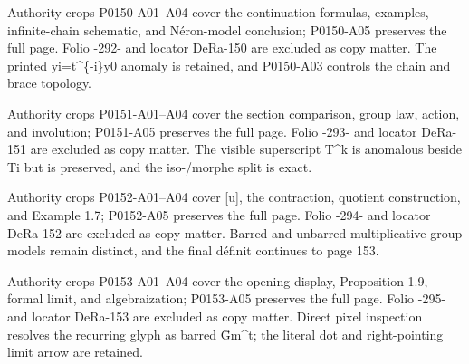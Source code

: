 \documentclass[11pt,a4paper]{article}
\begin{document}
\par\medskip
\hypertarget{D018-P0150}{}
\par\smallskip
Authority crops P0150-A01--A04 cover the continuation formulas, examples, infinite-chain schematic, and Néron-model conclusion; P0150-A05 preserves the full page. Folio -292- and locator DeRa-150 are excluded as copy matter. The printed y\textunderscore{}i=t\textasciicircum{}\{-i\}y\textunderscore{}0 anomaly is retained, and P0150-A03 controls the chain and brace topology.


\par\medskip
\hypertarget{D018-P0151}{}
\par\smallskip
Authority crops P0151-A01--A04 cover the section comparison, group law, action, and involution; P0151-A05 preserves the full page. Folio -293- and locator DeRa-151 are excluded as copy matter. The visible superscript T\textasciicircum{}k is anomalous beside T\textunderscore{}i but is preserved, and the iso-/morphe split is exact.


\par\medskip
\hypertarget{D018-P0152}{}
\par\smallskip
Authority crops P0152-A01--A04 cover [u], the contraction, quotient construction, and Example 1.7; P0152-A05 preserves the full page. Folio -294- and locator DeRa-152 are excluded as copy matter. Barred and unbarred multiplicative-group models remain distinct, and the final définit continues to page 153.


\par\medskip
\hypertarget{D018-P0153}{}
\par\smallskip
Authority crops P0153-A01--A04 cover the opening display, Proposition 1.9, formal limit, and algebraization; P0153-A05 preserves the full page. Folio -295- and locator DeRa-153 are excluded as copy matter. Direct pixel inspection resolves the recurring glyph as barred Ḡ\textunderscore{}m\textasciicircum{}t; the literal dot and right-pointing limit arrow are retained.
\end{document}
